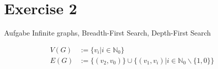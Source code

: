 
\section{Exercise 2}

\setcounter{exercise}{1}

\begin{frame}[allowframebreaks]{Aufgabe \thesection}{Infinite graphs, Breadth-First Search, Depth-First Search}
  \begin{exercisenoinc}    
    \begin{align*}
      V(G) &:= \{v_i | i \in \mathbb{N}_0\}\\
      E(G) &:= \{(v_2,v_0)\}\cup \{(v_1,v_i)| i \in \mathbb{N}_0\backslash \{1,0\}\}
    \end{align*}
  \end{exercisenoinc}
  \begin{solution}
    \begin{columns}
      \begin{column}[t]{0.5\textwidth}
      \end{column}
      \begin{column}[t]{0.5\textwidth}
\end{column}
\end{columns}
\end{solution}
\end{frame}
